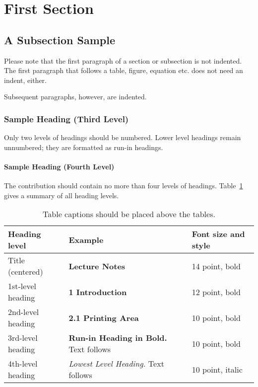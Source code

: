 \documentclass[runningheads]{llncs}
\begin{document}
% 

% 



\section{First Section}
\subsection{A Subsection Sample}
Please note that the first paragraph of a section or subsection is
not indented. The first paragraph that follows a table, figure,
equation etc. does not need an indent, either.

Subsequent paragraphs, however, are indented.

\subsubsection{Sample Heading (Third Level)} Only two levels of
headings should be numbered. Lower level headings remain unnumbered;
they are formatted as run-in headings.

\paragraph{Sample Heading (Fourth Level)}
The contribution should contain no more than four levels of
headings. Table~\ref{tab1} gives a summary of all heading levels.

\begin{table}
\caption{Table captions should be placed above the
tables.}\label{tab1}
\begin{tabular}{|l|l|l|}
\hline
Heading level &  Example & Font size and style\\
\hline
Title (centered) &  {\Large\bfseries Lecture Notes} & 14 point, bold\\
1st-level heading &  {\large\bfseries 1 Introduction} & 12 point, bold\\
2nd-level heading & {\bfseries 2.1 Printing Area} & 10 point, bold\\
3rd-level heading & {\bfseries Run-in Heading in Bold.} Text follows & 10 point, bold\\
4th-level heading & {\itshape Lowest Level Heading.} Text follows & 10 point, italic\\
\hline
\end{tabular}
\end{table}
\end{document}
